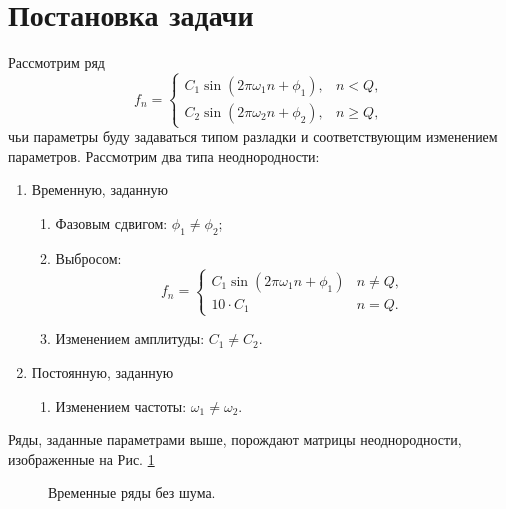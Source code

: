 \documentclass[specialist, substylefile = spbu.rtx,
			   subf, href, 12pt]{disser}
\begin{document}
\section{Постановка задачи}
Рассмотрим ряд $$f_n = 
\begin{cases}
	C_1\sin(2\pi\omega_1n + \phi_1), & n < Q, \\
	C_2\sin(2\pi\omega_2n + \phi_2), & n \geq Q,
\end{cases}$$
чьи параметры буду задаваться типом разладки и соответствующим изменением параметров.
Рассмотрим два типа неоднородности:
\begin{enumerate}
	\item
	Временную, заданную
	\begin{enumerate}
		\item 
		Фазовым сдвигом: $\phi_1 \neq \phi_2$;
		\item 
		Выбросом:
		$$f_n = 
		\begin{cases}
			C_1\sin(2\pi\omega_1n + \phi_1) & n \neq Q, \\
			10\cdot C_1 & n = Q.
		\end{cases}$$
		\item 
		Изменением амплитуды: $C_1 \neq C_2$.
	\end{enumerate}
	
	\item
	Постоянную, заданную
	\begin{enumerate}
		\item 
		Изменением частоты: $\omega_1 \neq \omega_2$.
	\end{enumerate}
	
\end{enumerate}

Ряды, заданные параметрами выше, порождают матрицы неоднородности, изображенные на Рис. \ref{pic:heterogeneity_types}
\begin{figure}[!hhh]
	\caption{Временные ряды без шума.}
	\label{pic:heterogeneity_types}
\end{figure}
\end{document}
